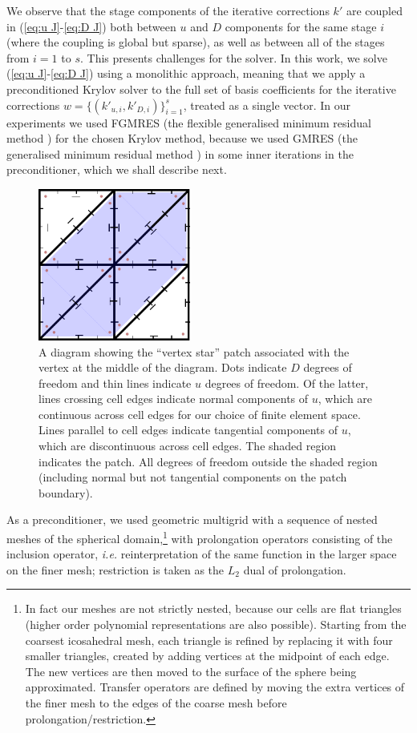 \documentclass[a4paper, 12pt]{article}
\begin{document}
We observe that the stage components of the iterative corrections $k'$
are coupled in (\ref{eq:u J}-\ref{eq:D J}) both between $u$ and $D$
components for the same stage $i$ (where the coupling is global but
sparse), as well as between all of the stages from $i=1$ to $s$. This
presents challenges for the solver. In this work, we solve (\ref{eq:u
  J}-\ref{eq:D J}) using a monolithic approach, meaning that we apply
a preconditioned Krylov solver to the full set of basis coefficients
for the iterative corrections $w=\{(k'_{u,i}, k'_{D,i})\}_{i=1}^s$,
treated as a single vector. In our experiments we used FGMRES (the
flexible generalised minimum residual method \citep{saad1993flexible})
for the chosen Krylov method, because we used GMRES (the generalised
minimum residual method \citep{saad1986gmres}) in some inner
iterations in the preconditioner, which we shall describe next.

\begin{figure}
  \center
  \includegraphics[width=5cm]{Images/patch}
  \caption{\label{fig:patch} A diagram showing the ``vertex
    star'' patch associated with the vertex at the middle of the
    diagram. Dots indicate $D$ degrees of freedom and thin lines
    indicate $u$ degrees of freedom. Of the latter, lines crossing
    cell edges indicate normal components of $u$, which are continuous
    across cell edges for our choice of finite element space.  Lines
    parallel to cell edges indicate tangential components of $u$,
    which are discontinuous across cell edges.  The shaded region
    indicates the patch.  All degrees of freedom outside the shaded
    region (including normal but not tangential components on the
    patch boundary).
  }
 \end{figure}

As a preconditioner, we used geometric multigrid with a sequence of
nested meshes of the spherical domain,\footnote{In fact our meshes are
not strictly nested, because our cells are flat triangles (higher
order polynomial representations are also possible). Starting from the
coarsest icosahedral mesh, each triangle is refined by replacing it
with four smaller triangles, created by adding vertices at the
midpoint of each edge. The new vertices are then moved to the surface
of the sphere being approximated. Transfer operators are defined by
moving the extra vertices of the finer mesh to the edges of the coarse
mesh before prolongation/restriction.} with prolongation operators
consisting of the inclusion operator, \emph{i.e.} reinterpretation of
the same function in the larger space on the finer mesh; restriction
is taken as the $L_2$ dual of prolongation.
\end{document}
